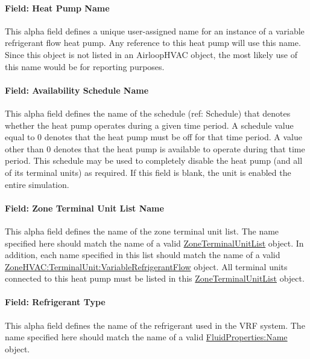\paragraph{Field: Heat Pump Name}\label{field-heat-pump-name-1}

This alpha field defines a unique user-assigned name for an instance of a variable refrigerant flow heat pump. Any reference to this heat pump will use this name. Since this object is not listed in an AirloopHVAC object, the most likely use of this name would be for reporting purposes.

\paragraph{Field: Availability Schedule Name}\label{field-availability-schedule-name-1-013}

This alpha field defines the name of the schedule (ref: Schedule) that denotes whether the heat pump operates during a given time period. A schedule value equal to 0 denotes that the heat pump must be off for that time period. A value other than 0 denotes that the heat pump is available to operate during that time period. This schedule may be used to completely disable the heat pump (and all of its terminal units) as required. If this field is blank, the unit is enabled the entire simulation.

\paragraph{Field: Zone Terminal Unit List Name}\label{field-zone-terminal-unit-list-name-1}

This alpha field defines the name of the zone terminal unit list. The name specified here should match the name of a valid \hyperref[zoneterminalunitlist]{ZoneTerminalUnitList} object. In addition, each name specified in this list should match the name of a valid \hyperref[zonehvacterminalunitvariablerefrigerantflow]{ZoneHVAC:TerminalUnit:VariableRefrigerantFlow} object. All terminal units connected to this heat pump must be listed in this \hyperref[zoneterminalunitlist]{ZoneTerminalUnitList} object.

\paragraph{Field: Refrigerant Type}\label{field-refrigerant-type-000}

This alpha field defines the name of the refrigerant used in the VRF system. The name specified here should match the name of a valid \hyperref[fluidpropertiesname]{FluidProperties:Name} object.

